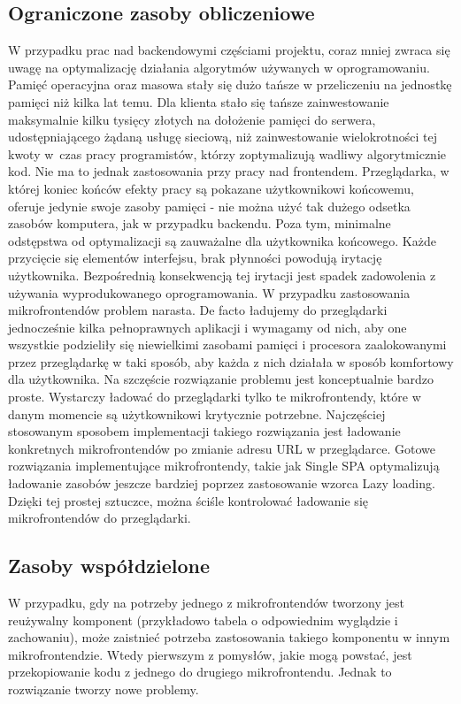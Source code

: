 \documentclass{SGGW-thesis}
\begin{document}
\subsection{Ograniczone zasoby obliczeniowe}
W przypadku prac nad backendowymi częściami projektu, coraz mniej zwraca się uwagę na optymalizację działania algorytmów używanych w oprogramowaniu. Pamięć operacyjna oraz masowa stały się dużo tańsze w przeliczeniu na jednostkę pamięci niż kilka lat temu. Dla klienta stało się tańsze zainwestowanie maksymalnie kilku tysięcy złotych na dołożenie pamięci do serwera, udostępniającego żądaną usługę sieciową, niż zainwestowanie wielokrotności tej kwoty w~czas pracy programistów, którzy zoptymalizują wadliwy algorytmicznie kod.
Nie ma to jednak zastosowania przy pracy nad frontendem. Przeglądarka, w której koniec końców efekty pracy są pokazane użytkownikowi końcowemu, oferuje jedynie swoje zasoby pamięci - nie można użyć tak dużego odsetka zasobów komputera, jak w przypadku backendu. Poza tym, minimalne odstępstwa od optymalizacji są zauważalne dla użytkownika końcowego. Każde przycięcie się elementów interfejsu, brak płynności powodują irytację użytkownika. Bezpośrednią konsekwencją tej irytacji jest spadek zadowolenia z używania wyprodukowanego oprogramowania. W przypadku zastosowania mikrofrontendów problem narasta. De facto ładujemy do przeglądarki jednocześnie kilka pełnoprawnych aplikacji i wymagamy od nich, aby one wszystkie podzieliły się niewielkimi zasobami pamięci i procesora zaalokowanymi przez przeglądarkę w taki sposób, aby każda z nich działała w sposób komfortowy dla użytkownika. Na szczęście rozwiązanie problemu jest konceptualnie bardzo proste. Wystarczy ładować do przeglądarki tylko te mikrofrontendy, które w danym momencie są użytkownikowi krytycznie potrzebne. Najczęściej stosowanym sposobem implementacji takiego rozwiązania jest ładowanie konkretnych mikrofrontendów po zmianie adresu URL w przeglądarce. Gotowe rozwiązania implementujące mikrofrontendy, takie jak Single SPA \cite{singlespa} optymalizują ładowanie zasobów jeszcze bardziej poprzez zastosowanie wzorca Lazy loading. Dzięki tej prostej sztuczce, można ściśle kontrolować ładowanie się mikrofrontendów do przeglądarki.

\subsection{Zasoby współdzielone}
W przypadku, gdy na potrzeby jednego z mikrofrontendów tworzony jest reużywalny komponent (przykładowo tabela o odpowiednim wyglądzie i zachowaniu), może zaistnieć potrzeba zastosowania takiego komponentu w innym mikrofrontendzie. Wtedy pierwszym z pomysłów, jakie mogą powstać, jest przekopiowanie kodu z jednego do drugiego mikrofrontendu. Jednak to rozwiązanie tworzy nowe problemy.
\end{document}
